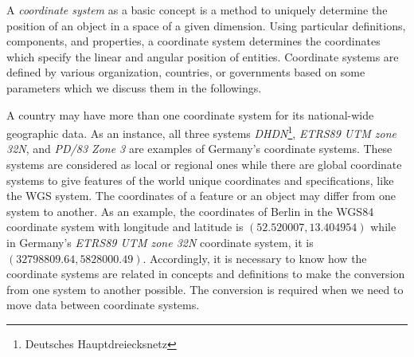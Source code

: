 \documentclass[a4paper,12pt]{article}
\begin{document}
A \emph{coordinate system} as a basic concept is a method to uniquely determine the position of an object in a space of a given dimension. Using particular definitions, components, and properties, a coordinate system determines the coordinates which specify the linear and angular position of entities. Coordinate systems are defined by various organization, countries, or governments based on some parameters which we discuss them in the followings.

A country may have more than one coordinate system for its national-wide geographic data. As an instance, all three systems \textit{DHDN}\footnote{Deutsches Hauptdreiecksnetz}, \textit{ETRS89 UTM zone 32N}, and \textit{PD/83 Zone 3} are examples of Germany's coordinate systems. These systems are considered as local or regional ones while there are global coordinate systems to give features of the world unique coordinates and specifications, like the WGS system. The coordinates of a feature or an object may differ from one system to another. As an example, the coordinates of Berlin in the WGS84 coordinate system with longitude and latitude is $(52.520007, 13.404954)$ while in Germany's \textit{ETRS89 UTM zone 32N} coordinate system, it is $(32798809.64, 5828000.49)$. Accordingly, it is necessary to know how the coordinate systems are related in concepts and definitions to make the conversion from one system to another possible. The conversion is required when we need to move data between coordinate systems.
\end{document}
